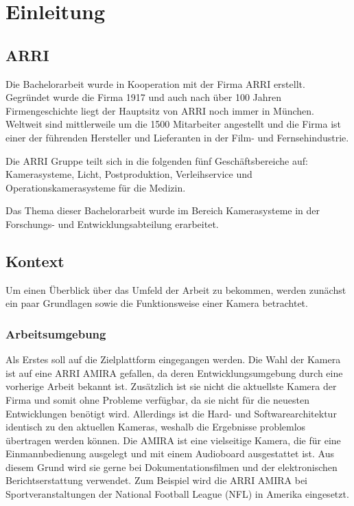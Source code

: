 \chapter{Einleitung}

\section{\acl{ARRI}}
Die Bachelorarbeit wurde in Kooperation mit der Firma \ac{ARRI} erstellt. Gegründet wurde die Firma 1917 und auch nach über 100 Jahren Firmengeschichte liegt der Hauptsitz von \ac{ARRI} noch immer in München. 
Weltweit sind mittlerweile um die 1500 Mitarbeiter angestellt und die Firma ist einer der führenden Hersteller und Lieferanten in der Film- und Fernsehindustrie.

Die \ac{ARRI} Gruppe teilt sich in die folgenden fünf Geschäftsbereiche auf: Kamerasysteme, Licht, Postproduktion, Verleihservice und Operations\-kamerasysteme für die Medizin. \cite{arricorpinfo}

Das Thema dieser Bachelorarbeit wurde im Bereich Kamerasysteme in der Forschungs- und Entwicklungsabteilung erarbeitet.

\section{Kontext}
Um einen Überblick über das Umfeld der Arbeit zu bekommen, werden zunächst ein paar Grundlagen sowie die Funktionsweise einer Kamera betrachtet.


\subsection{Arbeitsumgebung}
Als Erstes soll auf die Zielplattform eingegangen werden. Die Wahl der Kamera ist auf eine \ac{ARRI} AMIRA gefallen, da deren Entwicklungsumgebung durch eine vorherige Arbeit bekannt ist. Zusätzlich ist sie nicht die aktuellste Kamera der Firma und somit ohne Probleme verfügbar, da sie nicht für die neuesten Entwicklungen benötigt wird. Allerdings ist die Hard- und Softwarearchitektur identisch zu den aktuellen Kameras, weshalb die Ergebnisse problemlos übertragen werden können.
Die AMIRA ist eine vielseitige Kamera, die für eine Einmannbedienung ausgelegt und mit einem Audioboard ausgestattet ist. Aus diesem Grund wird sie gerne bei Dokumentationsfilmen und der elektronischen Berichtserstattung verwendet. Zum Beispiel wird die \ac{ARRI} AMIRA bei Sportveranstaltungen der National Football League (NFL) in Amerika eingesetzt.\cite{arrinewsamira} 

